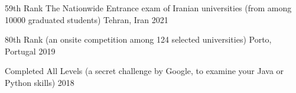 

\begin{cvhonors}

  \cvhonor
    {59th Rank} %
    {The Nationwide Entrance exam of Iranian universities (from among 10000 graduated students)} %
    {Tehran, Iran} %
    {2021} %

  \cvhonor
    {80th Rank} %
    { (an onsite competition among 124 selected universities)} %
    {Porto, Portugal} %
    {2019} %

  \cvhonor
    {Completed All Levels} %
    { (a secret challenge by Google, to examine your Java or Python skills)} %
    {} %
    {2018} %




\end{cvhonors}
